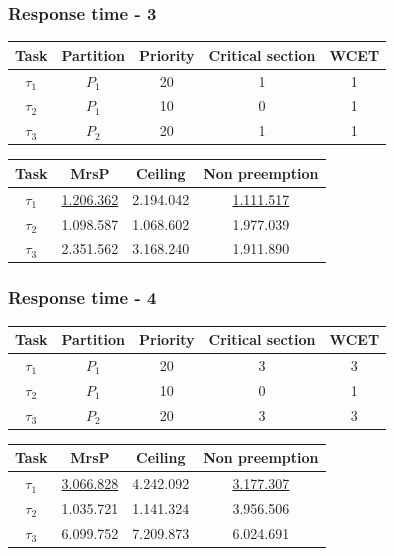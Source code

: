 \documentclass{beamer}
\begin{document}
\begin{frame}

  \frametitle{Response time - 3}

  \begin{table}
  \centering
  \begin{tabular}{ccccc}
  \hline\hline
    Task & Partition     & Priority & Critical section & WCET  \\ \hline
    $\tau_1$ & $P_1$  & 20 & 1 & 1 \\
    $\tau_2$ & $P_1$  & 10 & 0 & 1 \\
    $\tau_3$ & $P_2$  & 20 & 1 & 1 \\
    \hline
    \end{tabular}
  \end{table}

  \begin{table}
  \centering
  \begin{tabular}{cccc}
  \hline\hline
    Task & MrsP & Ceiling & Non preemption \\ \hline
    $\tau_1$ & \underline{1.206.362} & 2.194.042 & \underline{1.111.517} \\
    $\tau_2$ & 1.098.587 & 1.068.602 & 1.977.039 \\
    $\tau_3$ & 2.351.562 & 3.168.240 & 1.911.890 \\
    \hline
    \end{tabular}
  \end{table}

\end{frame}

\begin{frame}

  \frametitle{Response time - 4}

  \begin{table}
  \centering
  \begin{tabular}{ccccc}
  \hline\hline
    Task & Partition     & Priority & Critical section & WCET  \\ \hline
    $\tau_1$ & $P_1$  & 20 & 3 & 3 \\
    $\tau_2$ & $P_1$  & 10 & 0 & 1 \\
    $\tau_3$ & $P_2$  & 20 & 3 & 3 \\
    \hline
    \end{tabular}
  \end{table}

  \begin{table}
  \centering
  \begin{tabular}{cccc}
  \hline\hline
    Task & MrsP & Ceiling & Non preemption \\ \hline
    $\tau_1$ & \underline{3.066.828} & 4.242.092 & \underline{3.177.307} \\
    $\tau_2$ & 1.035.721 & 1.141.324 & 3.956.506 \\
    $\tau_3$ & 6.099.752 & 7.209.873 & 6.024.691 \\
    \hline
    \end{tabular}
  \end{table}
\end{frame}
\end{document}
